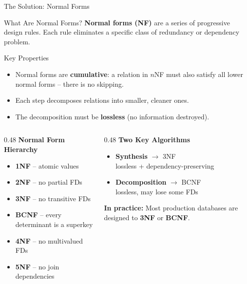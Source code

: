 \begin{frame}{The Solution: Normal Forms}
  \begin{block}{What Are Normal Forms?}
    \textbf{Normal forms (NF)} are a series of progressive design rules.
    Each rule eliminates a specific class of redundancy or dependency problem.
  \end{block}

  \begin{block}{Key Properties}
    \begin{itemize}
      \item Normal forms are \textbf{cumulative}: a relation in $n$NF must also
            satisfy all lower normal forms -- there is no skipping.
      \item Each step decomposes relations into smaller, cleaner ones.
      \item The decomposition must be \textbf{lossless} (no information destroyed).
    \end{itemize}
  \end{block}

  \begin{columns}[t]
    \begin{column}{0.48\textwidth}
      \textbf{Normal Form Hierarchy}
      \begin{itemize}
        \item \textbf{1NF} -- atomic values
        \item \textbf{2NF} -- no partial FDs
        \item \textbf{3NF} -- no transitive FDs
        \item \textbf{BCNF} -- every determinant is a superkey
        \item \textbf{4NF} -- no multivalued FDs
        \item \textbf{5NF} -- no join dependencies
      \end{itemize}
    \end{column}
    \begin{column}{0.48\textwidth}
      \textbf{Two Key Algorithms}
      \begin{itemize}
        \item \textbf{Synthesis} $\to$ 3NF\\
              lossless + dependency-preserving
        \item \textbf{Decomposition} $\to$ BCNF\\
              lossless, may lose some FDs
      \end{itemize}
      \vspace{0.5em}
      \textbf{In practice:} Most production databases are designed to \textbf{3NF} or \textbf{BCNF}.
    \end{column}
  \end{columns}
\end{frame}

